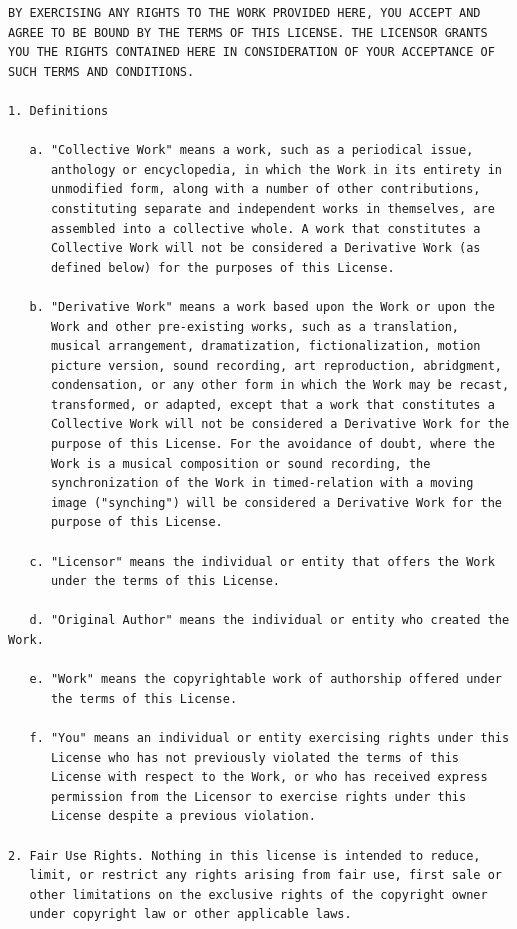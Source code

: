 \begin{verbatim}
BY EXERCISING ANY RIGHTS TO THE WORK PROVIDED HERE, YOU ACCEPT AND
AGREE TO BE BOUND BY THE TERMS OF THIS LICENSE. THE LICENSOR GRANTS
YOU THE RIGHTS CONTAINED HERE IN CONSIDERATION OF YOUR ACCEPTANCE OF
SUCH TERMS AND CONDITIONS.

1. Definitions

   a. "Collective Work" means a work, such as a periodical issue,
      anthology or encyclopedia, in which the Work in its entirety in
      unmodified form, along with a number of other contributions,
      constituting separate and independent works in themselves, are
      assembled into a collective whole. A work that constitutes a
      Collective Work will not be considered a Derivative Work (as
      defined below) for the purposes of this License.

   b. "Derivative Work" means a work based upon the Work or upon the
      Work and other pre-existing works, such as a translation,
      musical arrangement, dramatization, fictionalization, motion
      picture version, sound recording, art reproduction, abridgment,
      condensation, or any other form in which the Work may be recast,
      transformed, or adapted, except that a work that constitutes a
      Collective Work will not be considered a Derivative Work for the
      purpose of this License. For the avoidance of doubt, where the
      Work is a musical composition or sound recording, the
      synchronization of the Work in timed-relation with a moving
      image ("synching") will be considered a Derivative Work for the
      purpose of this License.

   c. "Licensor" means the individual or entity that offers the Work
      under the terms of this License.

   d. "Original Author" means the individual or entity who created the Work.

   e. "Work" means the copyrightable work of authorship offered under
      the terms of this License.

   f. "You" means an individual or entity exercising rights under this
      License who has not previously violated the terms of this
      License with respect to the Work, or who has received express
      permission from the Licensor to exercise rights under this
      License despite a previous violation.

2. Fair Use Rights. Nothing in this license is intended to reduce,
   limit, or restrict any rights arising from fair use, first sale or
   other limitations on the exclusive rights of the copyright owner
   under copyright law or other applicable laws.


\end{verbatim}
